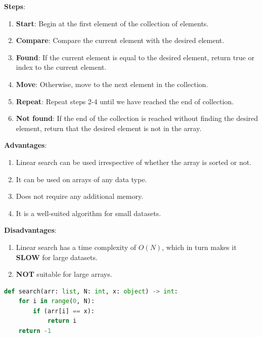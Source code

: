 \textbf{Steps}:
\begin{enumerate}
    \item \textbf{Start}: Begin at the first element of the collection of elements.
    \item \textbf{Compare}: Compare the current element with the desired element.
    \item \textbf{Found}: If the current element is equal to the desired element, return true or index to the current element.
    \item \textbf{Move}: Otherwise, move to the next element in the collection.
    \item \textbf{Repeat}: Repeat steps 2-4 until we have reached the end of collection.
    \item \textbf{Not found}: If the end of the collection is reached without finding the desired element, return that the desired element is not in the array.
\end{enumerate}

\begin{table}[h]
    \begin{minipage}[t]{0.48\linewidth}
        \textbf{Advantages}:
        \begin{enumerate}
            \item Linear search can be used irrespective of whether the array is sorted or not. 
            \item It can be used on arrays of any data type.
            \item Does not require any additional memory.
            \item It is a well-suited algorithm for small datasets.
        \end{enumerate}
    \end{minipage}
    \hfill
    \begin{minipage}[t]{0.48\linewidth}
        \textbf{Disadvantages}:
        \begin{enumerate}
            \item Linear search has a time complexity of $O(N)$, which in turn makes it \textbf{SLOW} for large datasets.
            \item \textbf{NOT} suitable for large arrays.
        \end{enumerate}
    \end{minipage}
\end{table}

\begin{lstlisting}[language=Python, caption=Linear Search Algorithm - Python]
def search(arr: list, N: int, x: object) -> int:
    for i in range(0, N):
        if (arr[i] == x):
            return i
    return -1
\end{lstlisting}

